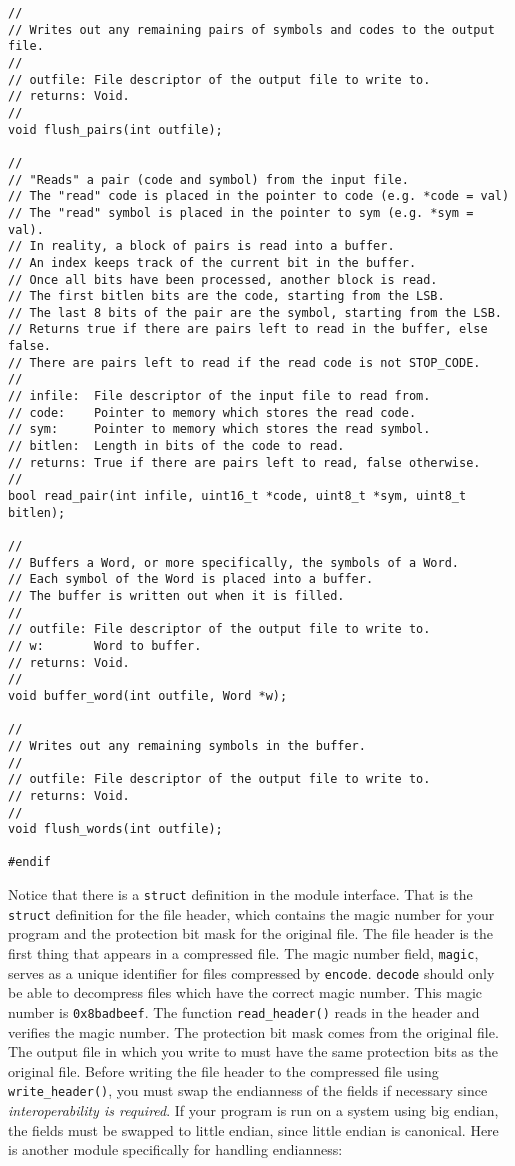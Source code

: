 \documentclass{article}
\begin{document}
\begin{lstlisting}[title=io.h]
//
// Writes out any remaining pairs of symbols and codes to the output file.
//
// outfile: File descriptor of the output file to write to.
// returns: Void.
//
void flush_pairs(int outfile);

//
// "Reads" a pair (code and symbol) from the input file.
// The "read" code is placed in the pointer to code (e.g. *code = val)
// The "read" symbol is placed in the pointer to sym (e.g. *sym = val).
// In reality, a block of pairs is read into a buffer.
// An index keeps track of the current bit in the buffer.
// Once all bits have been processed, another block is read.
// The first bitlen bits are the code, starting from the LSB.
// The last 8 bits of the pair are the symbol, starting from the LSB.
// Returns true if there are pairs left to read in the buffer, else false.
// There are pairs left to read if the read code is not STOP_CODE.
//
// infile:  File descriptor of the input file to read from.
// code:    Pointer to memory which stores the read code.
// sym:     Pointer to memory which stores the read symbol.
// bitlen:  Length in bits of the code to read.
// returns: True if there are pairs left to read, false otherwise.
//
bool read_pair(int infile, uint16_t *code, uint8_t *sym, uint8_t bitlen);

//
// Buffers a Word, or more specifically, the symbols of a Word.
// Each symbol of the Word is placed into a buffer.
// The buffer is written out when it is filled.
//
// outfile: File descriptor of the output file to write to.
// w:       Word to buffer.
// returns: Void.
//
void buffer_word(int outfile, Word *w);

//
// Writes out any remaining symbols in the buffer.
//
// outfile: File descriptor of the output file to write to.
// returns: Void.
//
void flush_words(int outfile);

#endif

\end{lstlisting}

Notice that there is a \texttt{struct} definition in the module interface. That
is the \texttt{struct} definition for the file header, which contains the magic
number for your program and the protection bit mask for the original file.  The
file header is the first thing that appears in a compressed file. The magic
number field, \texttt{magic}, serves as a unique identifier for files compressed
by \texttt{encode}. \texttt{decode} should only be able to decompress files
which have the correct magic number. This magic number is \texttt{0x8badbeef}.
The function \texttt{read\_header()} reads in the header and verifies the magic
number.  The protection bit mask comes from the original file. The output file
in which you write to must have the same protection bits as the original file.
Before writing the file header to the compressed file using
\texttt{write\_header()}, you must swap the endianness of the fields if
necessary since \emph{interoperability is required}. If your program is run on a
system using big endian, the fields must be swapped to little endian, since
little endian is canonical. Here is another module specifically for handling
endianness:
\end{document}
